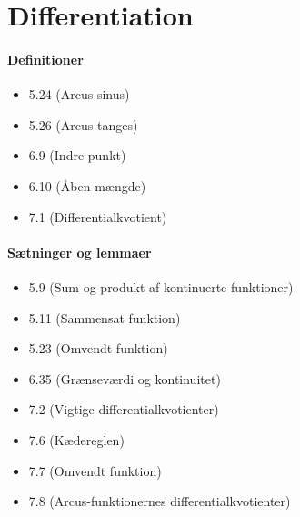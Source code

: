 \chapter{Differentiation}
\subsubsection{Definitioner}
\begin{itemize}
\setlength\itemsep{0em}
\item 5.24 (Arcus sinus)
\item 5.26 (Arcus tanges)
\item 6.9 (Indre punkt)
\item 6.10 (Åben mængde)
\item 7.1 (Differentialkvotient)
\end{itemize}
\subsubsection{Sætninger og lemmaer}
\begin{itemize}
\setlength\itemsep{0em}
\item 5.9 (Sum og produkt af kontinuerte funktioner)
\item 5.11 (Sammensat funktion)
\item 5.23 (Omvendt funktion)
\item 6.35 (Grænseværdi og kontinuitet)
\item 7.2 (Vigtige differentialkvotienter)
\item 7.6 (Kædereglen)
\item 7.7 (Omvendt funktion)
\item 7.8 (Arcus-funktionernes differentialkvotienter)
\end{itemize}
